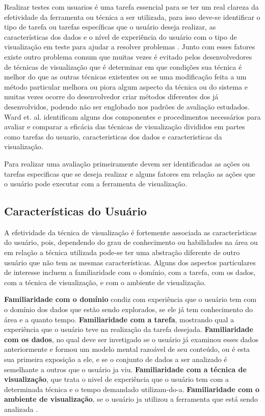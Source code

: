 Realizar testes com usuarios é uma tarefa essencial para se ter um  real clareza da efetividade da ferramenta ou técnica a ser utilizada, para isso deve-se identificar o tipo de tarefa ou tarefas específicas que o usuário deseja realizar, as características dos dados e o nível de experiência do usuário com o tipo de visualização em teste para ajudar a resolver problemas \cite{ward2015interactive}.
Junto com esses fatores existe outro problema \cite{ward2015interactive} comum que muitas vezes é evitado pelos desenvolvedores de técnicas de visualização que é determinar em que condições sua técnica é melhor do que as outras técnicas existentes ou se uma modificação feita a um método particular melhora ou piora algum aspecto da técnica ou do sistema e muitas vezes ocorre do desenvolvedor criar métodos diferentes dos já desenvolvidos, podendo não ser englobado nos padrões de avaliação estudados.
Ward et. al. \cite{ward2015interactive}  identificam alguns dos componentes e procedimentos necessários para avaliar e comparar a eficácia das técnicas de visualização divididos em partes como tarefas do usuario, caracteristicas dos dados e caracteristicas da visualização.

Para realizar uma avaliação primeiramente devem ser identificadas as ações ou tarefas especificas que se deseja realizar e alguns fatores em relação as ações que o usuário pode executar com a ferramenta de visualização.

\subsection{Características do Usuário}

A efetividade da técnica de visualização é fortemente associada as características do usuário, pois, dependendo do grau de conhecimento ou habilidades na área ou em relação a técnica utilizada pode-se ter uma abstração diferente de outro usuário que não tem as mesmas características. Alguns dos aspectos particulares de interesse incluem a familiaridade com o domínio, com a tarefa, com os dados, com a técnica de visualização, e com o ambiente de visualização.

\textbf{Familiaridade com o domínio} condiz com experiência que o usuário tem com o domínio dos dados que estão sendo explorados, se ele já tem conhecimento do área e a quanto tempo.
\textbf{Familiaridade com a tarefa}, mostrando qual a experiência que o usuário teve na realização da tarefa desejada.
\textbf{Familiaridade com os dados}, no qual deve ser invetigado se o usuário já examinou esses dados anteriormente e formou um modelo mental razoável de seu conteúdo, ou é esta sua primeira exposição a ele, e se o conjunto de dados a ser analizado é semelhante a outros que o usuário ja viu.
\textbf{Familiaridade com a técnica de visualização}, que trata o nivel de experiência que o usuário tem com a determinada técnica e o tempo demandado utilizam-do-a.
\textbf{Familiaridade com o ambiente de visualização}, se o usuário ja utilizou a ferramenta que está sendo analizada \cite{ward2015interactive}.

